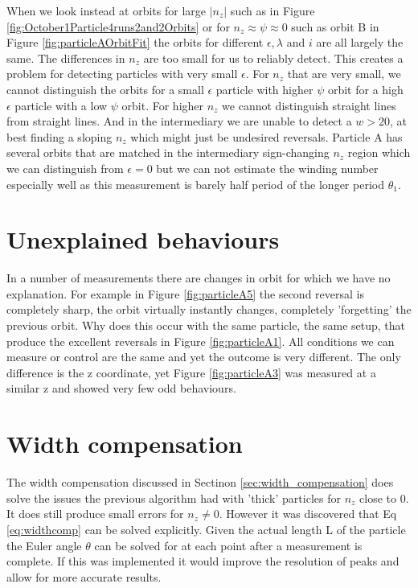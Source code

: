 When we look instead at orbits for large $\left| n_z \right|$ such as in Figure 
\ref{fig:October1Particle4runs2and2Orbits} or for $n_z \approx \psi \approx 0$ such as orbit B in Figure 
\ref{fig:particleAOrbitFit} the orbits for different $\epsilon, \lambda$ 
and $i$ are all largely the same. The differences in $n_z$ are too small for us to reliably detect. This creates a problem for 
detecting particles with very small $\epsilon$. For $n_z$ that are very small, we cannot distinguish the orbits for a 
small $\epsilon$ particle with higher $\psi$ orbit for a high $\epsilon$ particle with a low $\psi$ orbit. For higher 
$n_z$ we cannot distinguish straight lines from straight lines. And in the intermediary we are unable to detect a $w 
> 20$, at best finding a sloping $n_z$ which might just be undesired reversals. Particle A has several orbits that 
are matched in the intermediary sign-changing $n_z$ region which we can distinguish from $\epsilon = 0$ but we can not 
estimate the winding number especially well as this measurement is barely half period of the longer period $\theta_1$. 


\section{Unexplained behaviours}
In a number of measurements there are changes in orbit for which we have no explanation. For example in Figure \ref{fig:particleA5} the second reversal is completely sharp, the orbit virtually instantly changes, completely 'forgetting' the previous orbit. Why does this occur with the same particle, the same setup, that produce the excellent reversals in Figure \ref{fig:particleA1}. All conditions we can measure or control are the same and yet the outcome is very different. The only difference is the z coordinate, yet Figure \ref{fig:particleA3} was measured at a similar z and showed very few odd behaviours. 

\section{Width compensation}
The width compensation discussed in Sectinon \ref{sec:width_compensation} does solve the issues the previous algorithm had with 'thick' particles for $n_z$ close to 0. It does still produce small errors for $n_z \neq 0$. However it was discovered that Eq \ref{eq:widthcomp} can be solved explicitly. Given the actual length L of the particle the Euler angle $\theta$ can be solved for at each point after a measurement is complete. If this was implemented it would improve the resolution of peaks and allow for more accurate results.
